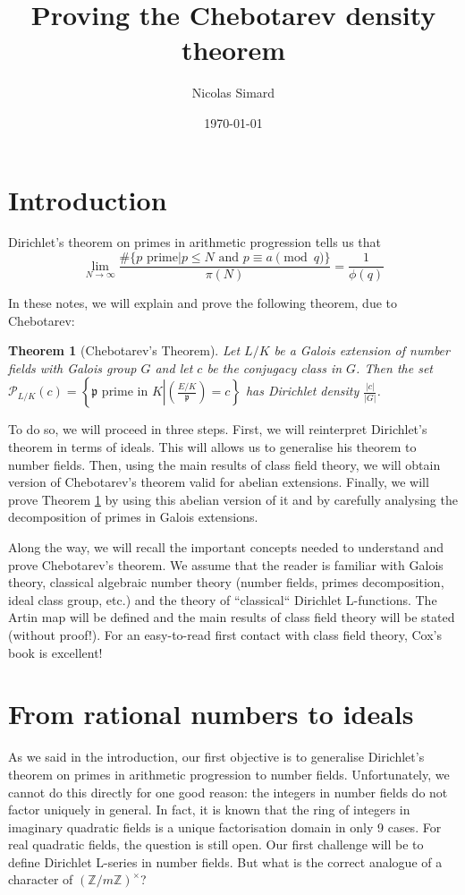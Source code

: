 \documentclass[]{amsart}
\title{Proving the Chebotarev density theorem}
\date{\today}
\author{Nicolas Simard}
\newtheorem{theorem}{Theorem}
\newcommand{\Z}{\mathbb{Z}}
\newcommand{\p}{\mathfrak{p}}
\newcommand{\PP}{\mathcal{P}}
\newcommand{\Frob}[2]{\left(\frac{#1}{#2}\right )}
\begin{document}
\maketitle
\tableofcontents
\section*{Introduction}
Dirichlet's theorem on primes in arithmetic progression tells us that
\[\lim_{N\rightarrow\infty}\frac{\#\{p\text{ prime}|p\leq N\text{ and }p\equiv a\pmod q\}}{\pi(N)}=\frac{1}{\phi(q)}\]

In these notes, we will explain and prove the following theorem, due to Chebotarev:

\begin{theorem}[Chebotarev's Theorem]\label{th:Tche}
	Let $L/K$ be a Galois extension of number fields with Galois group $G$ and let $c$ be the conjugacy class in $G$. Then the set $\PP_{L/K}(c)=\left \{\p\text{ prime in }K\left |\Frob{E/K}{\p}=c\right .\right \}$ has Dirichlet density $\frac{|c|}{|G|}$.
\end{theorem}

To do so, we will proceed in three steps. First, we will reinterpret Dirichlet's theorem in terms of ideals. This will allows us to generalise his theorem to number fields. Then, using the main results of class field theory, we will obtain version of Chebotarev's theorem valid for abelian extensions. Finally, we will prove Theorem \ref{th:Tche} by using this abelian version of it and by carefully analysing the decomposition of primes in Galois extensions.

Along the way, we will recall the important concepts needed to understand and prove Chebotarev's theorem. We assume that the reader is familiar with Galois theory, classical algebraic number theory (number fields, primes decomposition, ideal class group, etc.) and the theory of ``classical`` Dirichlet L-functions. The Artin map will be defined and the main results of class field theory will be stated (without proof!). For an easy-to-read first contact with class field theory, Cox's book \cite{Cox} is excellent!

\section{From rational numbers to ideals}
As we said in the introduction, our first objective is to generalise Dirichlet's theorem on primes in arithmetic progression to number fields. Unfortunately, we cannot do this directly for one good reason: the integers in number fields do not factor uniquely in general. In fact, it is known that the ring of integers in imaginary quadratic fields is a unique factorisation domain in only 9 cases. For real quadratic fields, the question is still open. Our first challenge will be to define Dirichlet L-series in number fields. But what is the correct analogue of a character of $(\Z/m\Z)^\times$?
\end{document}
